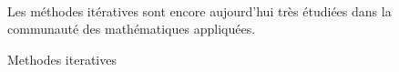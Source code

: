 


	\paragraph{}
	Les méthodes itératives sont encore aujourd'hui très étudiées dans la communauté des mathématiques appliquées.



	Methodes iteratives\cite{OlshanskiiTyrtyshnikov2014, Saad2003}




\pagebreak




